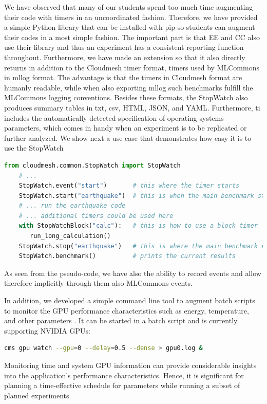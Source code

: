 \documentclass[utf8]{FrontiersinVancouver} %
\begin{document}
We have observed that many of our students spend too much time augmenting their code with timers in an uncoordinated fashion. Therefore, we have provided a simple Python library that can be installed with pip so students can augment their codes in a most simple fashion. The important part is that EE and CC also use their library and thus an experiment has a consistent reporting function throughout.  Furthermore, we have made an extension so that it also directly returns in addition to the Cloudmesh timer format, timers used by MLCommons in mllog format. The advantage is that the timers in Cloudmesh format are humanly readable, while when also exporting mllog such benchmarks fulfill the MLCommons logging conventions. Besides these formats, the StopWatch also produces summary tables in txt, csv, HTML, JSON, and YAML. Furthermore, ti includes the automatically detected specification of operating systems parameters, which comes in handy when an experiment is to be replicated or further analyzed.
We show next  a use case that demonstrates how easy it is to use the StopWatch


\begin{lstlisting}[language=Python]
    from cloudmesh.common.StopWatch import StopWatch 
    # ...
    StopWatch.event("start")       # this where the timer starts
    StopWatch.start("earthquake")  # this is when the main benchmark starts
    # ... run the earthquake code
    # ... additional timers could be used here
    with StopWatchBlock("calc"):   # this is how to use a block timer
       run_long_calculation()
    StopWatch.stop("earthquake")   # this is where the main benchmark ends
    StopWatch.benchmark()          # prints the current results
\end{lstlisting}

As seen from the pseudo-code, we have also the ability to record events and allow therefore implicitly through them also  MLCommons events.

In addition, we developed a simple command line tool to augment batch scripts to monitor the GPU performance characteristics such as energy, temperature, and other parameters \citep{cloudmesh-gpu}. It  can be started in a batch script and is currently supporting NVIDIA GPUs:


\begin{lstlisting}[language=sh]
    cms gpu watch --gpu=0 --delay=0.5 --dense > gpu0.log &
\end{lstlisting}


Monitoring time and system GPU information can provide considerable insights into the application's performance characteristics. Hence, it is significant for planning a time-effective schedule for parameters while running a subset of planned experiments.
\end{document}
